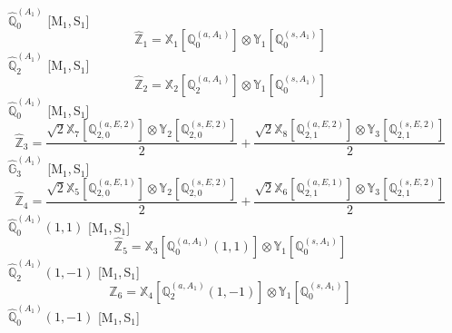 \documentclass[fleqn,10pt,landscape]{article}
\begin{document}
\begin{itemize}
\vspace{4mm}
\noindent {} $\,\,\,\hat{\mathbb{Q}}_{0}^{(A_{1})}$ [M$_{1}$,\,S$_{1}$]
\begin{dmath*}
\hat{\mathbb{Z}}_{1}=\mathbb{X}_{1}[\mathbb{Q}_{0}^{(a,A_{1})}] \otimes\mathbb{Y}_{1}[\mathbb{Q}_{0}^{(s,A_{1})}]
\end{dmath*}
\vspace{4mm}
\noindent {} $\,\,\,\hat{\mathbb{Q}}_{2}^{(A_{1})}$ [M$_{1}$,\,S$_{1}$]
\begin{dmath*}
\hat{\mathbb{Z}}_{2}=\mathbb{X}_{2}[\mathbb{Q}_{2}^{(a,A_{1})}] \otimes\mathbb{Y}_{1}[\mathbb{Q}_{0}^{(s,A_{1})}]
\end{dmath*}
\vspace{4mm}
\noindent {} $\,\,\,\hat{\mathbb{Q}}_{0}^{(A_{1})}$ [M$_{1}$,\,S$_{1}$]
\begin{dmath*}
\hat{\mathbb{Z}}_{3}=\frac{\sqrt{2} \mathbb{X}_{7}[\mathbb{Q}_{2,0}^{(a,E,2)}] \otimes\mathbb{Y}_{2}[\mathbb{Q}_{2,0}^{(s,E,2)}]}{2} + \frac{\sqrt{2} \mathbb{X}_{8}[\mathbb{Q}_{2,1}^{(a,E,2)}] \otimes\mathbb{Y}_{3}[\mathbb{Q}_{2,1}^{(s,E,2)}]}{2}
\end{dmath*}
\vspace{4mm}
\noindent {} $\,\,\,\hat{\mathbb{G}}_{3}^{(A_{1})}$ [M$_{1}$,\,S$_{1}$]
\begin{dmath*}
\hat{\mathbb{Z}}_{4}=\frac{\sqrt{2} \mathbb{X}_{5}[\mathbb{Q}_{2,0}^{(a,E,1)}] \otimes\mathbb{Y}_{2}[\mathbb{Q}_{2,0}^{(s,E,2)}]}{2} + \frac{\sqrt{2} \mathbb{X}_{6}[\mathbb{Q}_{2,1}^{(a,E,1)}] \otimes\mathbb{Y}_{3}[\mathbb{Q}_{2,1}^{(s,E,2)}]}{2}
\end{dmath*}
\vspace{4mm}
\noindent {} $\,\,\,\hat{\mathbb{Q}}_{0}^{(A_{1})}(1,1)$ [M$_{1}$,\,S$_{1}$]
\begin{dmath*}
\hat{\mathbb{Z}}_{5}=\mathbb{X}_{3}[\mathbb{Q}_{0}^{(a,A_{1})}(1,1)] \otimes\mathbb{Y}_{1}[\mathbb{Q}_{0}^{(s,A_{1})}]
\end{dmath*}
\vspace{4mm}
\noindent {} $\,\,\,\hat{\mathbb{Q}}_{2}^{(A_{1})}(1,-1)$ [M$_{1}$,\,S$_{1}$]
\begin{dmath*}
\hat{\mathbb{Z}}_{6}=\mathbb{X}_{4}[\mathbb{Q}_{2}^{(a,A_{1})}(1,-1)] \otimes\mathbb{Y}_{1}[\mathbb{Q}_{0}^{(s,A_{1})}]
\end{dmath*}
\vspace{4mm}
\noindent {} $\,\,\,\hat{\mathbb{Q}}_{0}^{(A_{1})}(1,-1)$ [M$_{1}$,\,S$_{1}$]
\begin{dmath*}

\end{dmath*}
\end{itemize}
\end{document}
